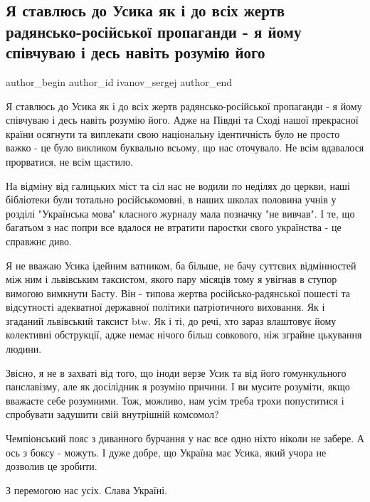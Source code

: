  
 
 
 
 
 
\subsection{Я ставлюсь до Усика як і до всіх жертв радянсько-російської пропаганди - я йому співчуваю і десь навіть розумію його}
\label{sec:26_09_2021.fb.ivanov_sergej.1.usik_propaganda}
 
\ifcmt
 author_begin
   author_id ivanov_sergej
 author_end
\fi

Я ставлюсь до Усика як і до всіх жертв радянсько-російської пропаганди - я йому
співчуваю і десь навіть розумію його. Адже на Півдні та Сході нашої прекрасної
країни осягнути та виплекати свою національну ідентичність було не просто важко
- це було викликом буквально всьому, що нас оточувало. Не всім вдавалося
прорватися, не всім щастило. 

На відміну від галицьких міст та сіл нас не водили по неділях до церкви, наші
бібліотеки були тотально російськомовні, в наших школах половина учнів у
розділі "Українська мова" класного журналу мала позначку "не вивчав". І те, що
багатьом з нас попри все вдалося не втратити паростки свого українства - це
справжнє диво. 

Я не вважаю Усика ідейним ватником, ба більше, не бачу суттєвих відмінностей
між ним і львівським таксистом, якого пару місяців тому я увігнав в ступор
вимогою вимкнути Басту. Він - типова жертва російсько-радянської пошесті та
відсутності адекватної державної політики патріотичного виховання. Як і
згаданий львівський таксист btw. Як і ті, до речі, хто зараз влаштовує йому
колективні обструкції, адже немає нічого більш совкового, ніж зграйне цькування
людини. 

Звісно, я не в захваті від того, що іноди верзе Усик та від його гомункульного
панславізму, але як досілідник я розумію причини. І ви мусите розуміти, якщо
вважаєте себе розумними. Тож, можливо, нам усім треба трохи попуститися і
спробувати задушити свій внутрішній комсомол? 

Чемпіонський пояс з диванного бурчання у нас все одно ніхто ніколи не забере. А
ось з боксу - можуть. І дуже добре, що Україна має Усика, який учора не
дозволив це зробити. 

З перемогою нас усіх. Слава Україні.

